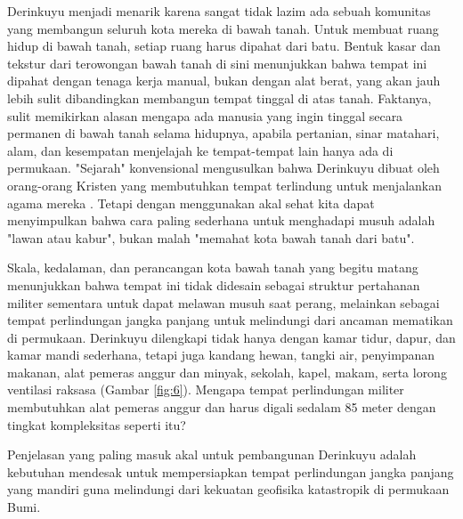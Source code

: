 \documentclass[10pt,twocolumn,letterpaper]{article}
\begin{document}
Derinkuyu menjadi menarik karena sangat tidak lazim ada sebuah komunitas yang membangun seluruh kota mereka di bawah tanah. Untuk membuat ruang hidup di bawah tanah, setiap ruang harus dipahat dari batu. Bentuk kasar dan tekstur dari terowongan bawah tanah di sini menunjukkan bahwa tempat ini dipahat dengan tenaga kerja manual, bukan dengan alat berat, yang akan jauh lebih sulit dibandingkan membangun tempat tinggal di atas tanah. Faktanya, sulit memikirkan alasan mengapa ada manusia yang ingin tinggal secara permanen di bawah tanah selama hidupnya, apabila pertanian, sinar matahari, alam, dan kesempatan menjelajah ke tempat-tempat lain hanya ada di permukaan. "Sejarah" konvensional mengusulkan bahwa Derinkuyu dibuat oleh orang-orang Kristen yang membutuhkan tempat terlindung untuk menjalankan agama mereka \cite{53}. Tetapi dengan menggunakan akal sehat kita dapat menyimpulkan bahwa cara paling sederhana untuk menghadapi musuh adalah "lawan atau kabur", bukan malah "memahat kota bawah tanah dari batu".

Skala, kedalaman, dan perancangan kota bawah tanah yang begitu matang menunjukkan bahwa tempat ini tidak didesain sebagai struktur pertahanan militer sementara untuk dapat melawan musuh saat perang, melainkan sebagai tempat perlindungan jangka panjang untuk melindungi dari ancaman mematikan di permukaan. Derinkuyu dilengkapi tidak hanya dengan kamar tidur, dapur, dan kamar mandi sederhana, tetapi juga kandang hewan, tangki air, penyimpanan makanan, alat pemeras anggur dan minyak, sekolah, kapel, makam, serta lorong ventilasi raksasa (Gambar \ref{fig:6}). Mengapa tempat perlindungan militer membutuhkan alat pemeras anggur dan harus digali sedalam 85 meter dengan tingkat kompleksitas seperti itu?

Penjelasan yang paling masuk akal untuk pembangunan Derinkuyu adalah kebutuhan mendesak untuk mempersiapkan tempat perlindungan jangka panjang yang mandiri guna melindungi dari kekuatan geofisika katastropik di permukaan Bumi.
\end{document}
